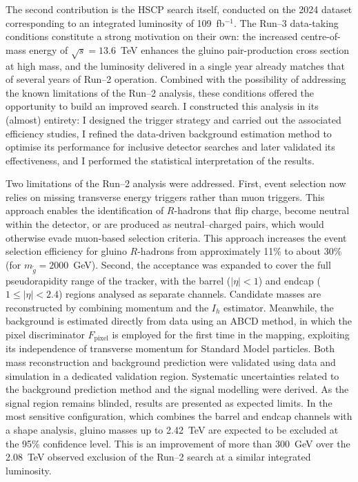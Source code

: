 The second contribution is the HSCP search itself, conducted on the 2024 dataset corresponding to an integrated luminosity of 109~fb$^{-1}$. The Run--3 data-taking conditions constitute a strong motivation on their own: the increased centre-of-mass energy of $\sqrt{s} = 13.6$~TeV enhances the gluino pair-production cross section at high mass, and the luminosity delivered in a single year already matches that of several years of Run--2 operation. Combined with the possibility of addressing the known limitations of the Run--2 analysis, these conditions offered the opportunity to build an improved search. I constructed this analysis in its (almost) entirety: I designed the trigger strategy and carried out the associated efficiency studies, I refined the data-driven background estimation method to optimise its performance for inclusive detector searches and later validated its effectiveness, and I performed the statistical interpretation of the results.

Two limitations of the Run--2 analysis were addressed. First, event selection now relies on missing transverse energy triggers rather than muon triggers. This approach enables the identification of $R$-hadrons that flip charge, become neutral within the detector, or are produced as neutral–charged pairs, which would otherwise evade muon-based selection criteria. This approach increases the event selection efficiency for gluino $R$-hadrons from approximately 11\% to about 30\% (for $m_{\tilde{g}}=2000$~GeV). Second, the acceptance was expanded to cover the full pseudorapidity range of the tracker, with the barrel ($|\eta| < 1$) and endcap ($1 \leq |\eta| < 2.4$) regions analysed as separate channels. Candidate masses are reconstructed by combining momentum and the $I_h$ estimator. Meanwhile, the background is estimated directly from data using an ABCD method, in which the pixel discriminator $F_{\text{pixel}}$ is employed for the first time in the mapping, exploiting its independence of transverse momentum for Standard Model particles. Both mass reconstruction and background prediction were validated using data and simulation in a dedicated validation region. Systematic uncertainties related to the background prediction method and the signal modelling were derived. As the signal region remains blinded, results are presented as expected limits. In the most sensitive configuration, which combines the barrel and endcap channels with a shape analysis, gluino masses up to 2.42~TeV are expected to be excluded at the 95\% confidence level. This is an improvement of more than 300~GeV over the 2.08~TeV observed exclusion of the Run--2 search at a similar integrated luminosity.


